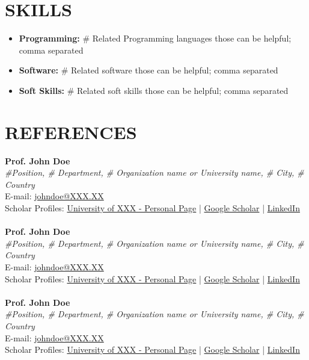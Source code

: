 \documentclass[a4paper,9pt]{extarticle}
\begin{document}
\section*{SKILLS}
\begin{itemize}
    \item \textbf{Programming:} \# Related Programming languages those can be helpful; comma separated
    \item \textbf{Software:} \# Related software those can be helpful; comma separated
    \item \textbf{Soft Skills:} \# Related soft skills those can be helpful; comma separated
\end{itemize}

\section*{REFERENCES}
\textbf{Prof. John Doe}\\
\textit{\#Position, \# Department, \# Organization name or University name, \# City, \# Country}\\
E-mail: \href{mailto:johndoe@XXX.XX}{johndoe@XXX.XX}\\
Scholar Profiles: \href{related link}{University of XXX - Personal Page} | \href{related link}{Google Scholar} | \href{https://www.linkedin.com/in/xxxxxxxx}{LinkedIn}\\ \\
\textbf{Prof. John Doe}\\
\textit{\#Position, \# Department, \# Organization name or University name, \# City, \# Country}\\
E-mail: \href{mailto:johndoe@XXX.XX}{johndoe@XXX.XX}\\
Scholar Profiles: \href{related link}{University of XXX - Personal Page} | \href{related link}{Google Scholar} | \href{https://www.linkedin.com/in/xxxxxxxx}{LinkedIn}\\ \\
\textbf{Prof. John Doe}\\
\textit{\#Position, \# Department, \# Organization name or University name, \# City, \# Country}\\
E-mail: \href{mailto:johndoe@XXX.XX}{johndoe@XXX.XX}\\
Scholar Profiles: \href{related link}{University of XXX - Personal Page} | \href{related link}{Google Scholar} | \href{https://www.linkedin.com/in/xxxxxxxx}{LinkedIn}\\ \\
\end{document}
